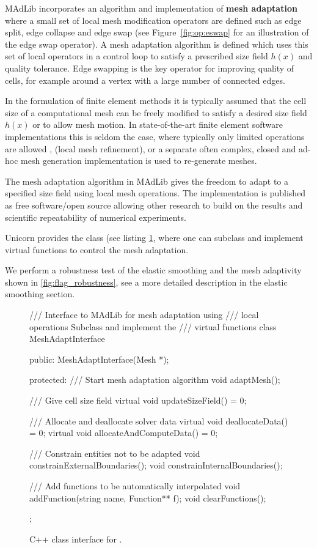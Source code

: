 MAdLib incorporates an algorithm and implementation of {\bf mesh
adaptation} where a small set of local mesh modification operators are
defined such as edge split, edge collapse and edge swap (see
Figure~\ref{fig:op:eswap} for an illustration of the edge swap
operator). A mesh adaptation algorithm is defined which uses this set
of local operators in a control loop to satisfy a prescribed size
field $h(x)$ and quality tolerance. Edge swapping is the key operator
for improving quality of cells, for example around a vertex with a
large number of connected edges.

In the formulation of finite element methods it is typically assumed
that the cell size of a computational mesh can be freely modified
to satisfy a desired size field $h(x)$ or to allow mesh motion. In
state-of-the-art finite element software implementations this
is seldom the case, where typically only limited operations are
allowed \citep{BangerthHartmannKanschat2007, COMSOL2009}, (local
mesh refinement), or a separate often complex, closed and ad-hoc mesh
generation implementation is used to re-generate meshes.

The mesh adaptation algorithm in MAdLib gives the freedom to adapt to a
specified size field using local mesh operations. The implementation is
published as free software/open source allowing other research to build
on the results and scientific repeatability of numerical experiments.

Unicorn provides the  class (see listing
\ref{code:MeshAdaptInterface}, where one can subclass and implement
virtual functions to control the mesh adaptation.

We perform a robustness test of the elastic smoothing and the mesh
adaptivity shown in \ref{fig:flag_robustness}, see a more detailed
description in the elastic smoothing section.

\begin{figure}
\begin{c++}
/// Interface to MAdLib for mesh adaptation using
/// local operations Subclass and implement the
/// virtual functions
class MeshAdaptInterface
{
public:
  MeshAdaptInterface(Mesh *);

protected:
  /// Start mesh adaptation algorithm
  void adaptMesh();

  /// Give cell size field
  virtual void updateSizeField() = 0;

  /// Allocate and deallocate solver data
  virtual void deallocateData() = 0;
  virtual void allocateAndComputeData() = 0;

  /// Constrain entities not to be adapted
  void constrainExternalBoundaries();
  void constrainInternalBoundaries();

  /// Add functions to be automatically interpolated
  void addFunction(string name, Function** f);
  void clearFunctions();
};
\end{c++}
\caption{C++ class interface for .}
\label{code:MeshAdaptInterface}
\end{figure}

